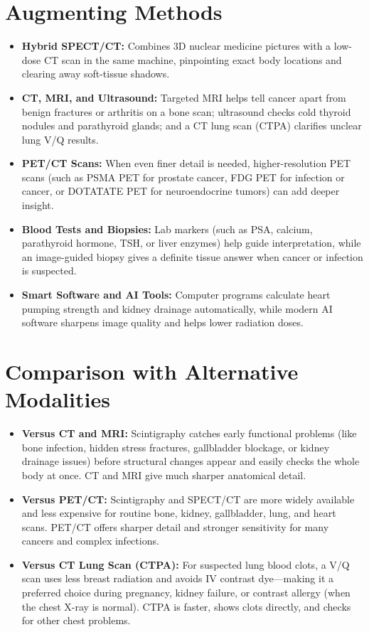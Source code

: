 \section{Augmenting Methods}
\begin{itemize}
\item \textbf{Hybrid SPECT/CT:} Combines 3D nuclear medicine pictures with a low-dose CT scan in the same machine, pinpointing exact body locations and clearing away soft-tissue shadows.
\item \textbf{CT, MRI, and Ultrasound:} Targeted MRI helps tell cancer apart from benign fractures or arthritis on a bone scan; ultrasound checks cold thyroid nodules and parathyroid glands; and a CT lung scan (CTPA) clarifies unclear lung V/Q results.
\item \textbf{PET/CT Scans:} When even finer detail is needed, higher-resolution PET scans (such as PSMA PET for prostate cancer, FDG PET for infection or cancer, or DOTATATE PET for neuroendocrine tumors) can add deeper insight.
\item \textbf{Blood Tests and Biopsies:} Lab markers (such as PSA, calcium, parathyroid hormone, TSH, or liver enzymes) help guide interpretation, while an image-guided biopsy gives a definite tissue answer when cancer or infection is suspected.
\item \textbf{Smart Software and AI Tools:} Computer programs calculate heart pumping strength and kidney drainage automatically, while modern AI software sharpens image quality and helps lower radiation doses.
\end{itemize}

\section{Comparison with Alternative Modalities}
\begin{itemize}
\item \textbf{Versus CT and MRI:} Scintigraphy catches early functional problems (like bone infection, hidden stress fractures, gallbladder blockage, or kidney drainage issues) before structural changes appear and easily checks the whole body at once. CT and MRI give much sharper anatomical detail.
\item \textbf{Versus PET/CT:} Scintigraphy and SPECT/CT are more widely available and less expensive for routine bone, kidney, gallbladder, lung, and heart scans. PET/CT offers sharper detail and stronger sensitivity for many cancers and complex infections.
\item \textbf{Versus CT Lung Scan (CTPA):} For suspected lung blood clots, a V/Q scan uses less breast radiation and avoids IV contrast dye---making it a preferred choice during pregnancy, kidney failure, or contrast allergy (when the chest X-ray is normal). CTPA is faster, shows clots directly, and checks for other chest problems.
\end{itemize}

